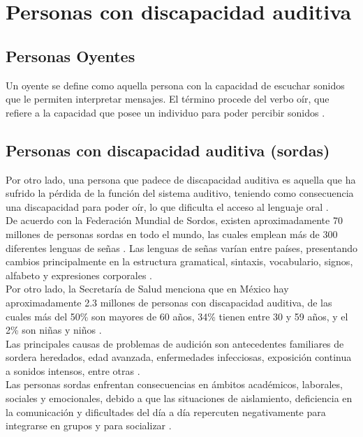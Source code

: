 \section{Personas con discapacidad auditiva}
\subsection{Personas Oyentes}
Un oyente se define como aquella persona con la capacidad de escuchar sonidos que le permiten interpretar mensajes. El término procede del verbo oír, que refiere a la capacidad que posee un individuo para poder percibir sonidos \cite{ref26}.

\subsection{Personas con discapacidad auditiva (sordas)}
Por otro lado, una persona que padece de discapacidad auditiva es aquella que ha sufrido la pérdida de la función del sistema auditivo, teniendo como consecuencia una discapacidad para poder oír, lo que dificulta el acceso al lenguaje oral \cite{ref27}.\\ 

De acuerdo con la Federación Mundial de Sordos, existen aproximadamente 70 millones de personas sordas en todo el mundo, las cuales emplean más de 300 diferentes lenguas de señas \cite{ref28}. Las lenguas de señas varían entre países, presentando cambios principalmente en la estructura gramatical, sintaxis, vocabulario, signos, alfabeto y expresiones corporales \cite{ref26}.\\

Por otro lado, la Secretaría de Salud menciona que en México hay aproximadamente 2.3 millones de personas con discapacidad auditiva, de las cuales más del 50\% son mayores de 60 años, 34\% tienen entre 30 y 59 años, y el 2\% son niñas y niños \cite{ref3}.\\

Las principales causas de problemas de audición son antecedentes familiares de sordera heredados, edad avanzada, enfermedades infecciosas, exposición continua a sonidos intensos, entre otras \cite{ref3}.\\

Las personas sordas enfrentan consecuencias en ámbitos académicos, laborales, sociales y emocionales, debido a que las situaciones de aislamiento, deficiencia en la comunicación y dificultades del día a día repercuten negativamente para integrarse en grupos y para socializar \cite{ref29}. \\


